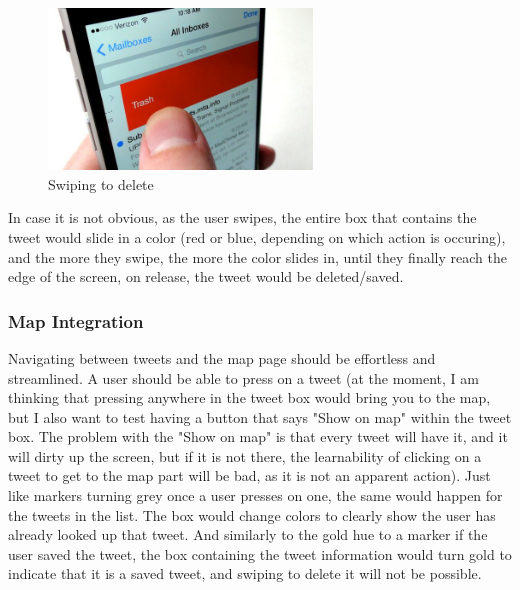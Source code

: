 \documentclass[11pt]{article}
\begin{document}
\begin{figure}[H]
    \centering
    \includegraphics[width=7cm]{swipeDelete}
    \caption{Swiping to delete}
    \label{fig:swipeDelete}
\end{figure}

In case it is not obvious, as the user swipes, the entire box that contains the tweet would slide in a color (red or blue, depending on which action is occuring), and the more they swipe, the more the color slides in, until they finally reach the edge of the screen, on release, the tweet would be deleted/saved.

\subsubsection{Map Integration}
Navigating between tweets and the map page should be effortless and streamlined. A user should be able to press on a tweet (at the moment, I am thinking that pressing anywhere in the tweet box would bring you to the map, but I also want to test having a button that says "Show on map" within the tweet box. The problem with the "Show on map" is that every tweet will have it, and it will dirty up the screen, but if it is not there, the learnability of clicking on a tweet to get to the map part will be bad, as it is not an apparent action). Just like markers turning grey once a user presses on one, the same would happen for the tweets in the list. The box would change colors to clearly show the user has already looked up that tweet. And similarly to the gold hue to a marker if the user saved the tweet, the box containing the tweet information would turn gold to indicate that it is a saved tweet, and swiping to delete it will not be possible.



\end{document}

